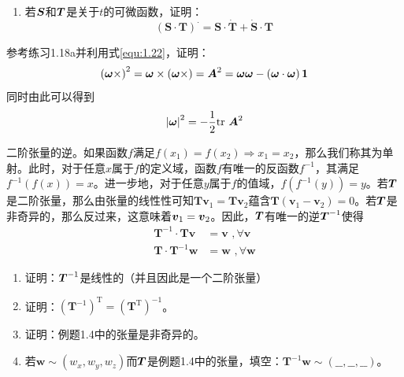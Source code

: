 \begin{exercise}
\begin{enumerate}
        \item 若$\boldsymbol{S}$和$\boldsymbol{T}$是关于$t$的可微函数，证明：
        \begin{equation}
            \left( \boldsymbol{S}\cdot \boldsymbol{T} \right) ^{\cdot}=\boldsymbol{S}\cdot \dot{\boldsymbol{T}}+\dot{\boldsymbol{S}}\cdot \boldsymbol{T}
        \end{equation}
    \end{enumerate}
    \item 参考练习1.18a并利用式\eqref{equ:1.22}，证明：
    \begin{equation}\label{equ:1.49}
        \left( \boldsymbol{\omega } \times \right) ^2=\boldsymbol{\omega } \times \left( \boldsymbol{\omega } \times \right) =\boldsymbol{A}^2=\boldsymbol{\omega } \boldsymbol{\omega } -\left( \boldsymbol{\omega } \cdot \boldsymbol{\omega } \right) \boldsymbol{1}
    \end{equation}
    同时由此可以得到
    \begin{equation*}
        \left| \boldsymbol{\omega } \right|^2=-\frac{1}{2}\mathrm{tr}~ \boldsymbol{A}^2
    \end{equation*}
    \item 二阶张量的逆。如果函数$f$满足$f\left( x_1 \right) =f\left( x_2 \right) \Rightarrow x_1=x_2$，那么我们称其为单射。此时，对于任意$x$属于$f$的定义域，函数$f$有唯一的反函数$f^{-1}$，其满足$f^{-1}\left( f\left( x \right) \right) =x$。进一步地，对于任意$y$属于$f$的值域，$f\left( f^{-1}\left( y \right) \right) =y$。若$\boldsymbol{T}$是二阶张量，那么由张量的线性性可知$\boldsymbol{Tv}_1=\boldsymbol{Tv}_2$蕴含$\boldsymbol{T}\left( \boldsymbol{v}_1-\boldsymbol{v}_2 \right) =0$。若$\boldsymbol{T}$是非奇异的，那么反过来，这意味着$\boldsymbol{v}_1=\boldsymbol{v}_2$。因此，$\boldsymbol{T}$有唯一的逆$\boldsymbol{T}^{-1}$使得
    \begin{equation}
        \begin{aligned}
            \boldsymbol{T}^{-1}\cdot \boldsymbol{Tv}&=\boldsymbol{v}\,\, ,  \forall \boldsymbol{v}\\
            \boldsymbol{T}\cdot \boldsymbol{T}^{-1}\boldsymbol{w}&=\boldsymbol{w}\,\, ,  \forall \boldsymbol{w}
        \end{aligned}
    \end{equation}
    \begin{enumerate}
        \item 证明：$\boldsymbol{T}^{-1}$是线性的（并且因此是一个二阶张量）
        \item 证明：$\left( \boldsymbol{T}^{-1} \right) ^{\mathrm{T}}=\left( \boldsymbol{T}^{\mathrm{T}} \right) ^{-1}$。
        \item 证明：例题1.4中的张量是非奇异的。
        \item 若$\boldsymbol{w}\sim \left( w_x,w_y,w_z \right) $而$\boldsymbol{T}$是例题1.4中的张量，填空：$\boldsymbol{T}^{-1}\boldsymbol{w}\sim \left( \_\_,\_\_,\_\_ \right) $。
        

\end{enumerate}
\end{exercise}
